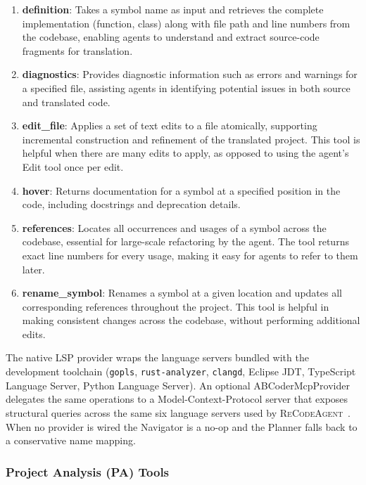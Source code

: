 \begin{enumerate}
    \item \textbf{definition}: Takes a symbol name as input and
    retrieves the complete implementation (function, class) along with
    file path and line numbers from the codebase, enabling agents to
    understand and extract source-code fragments for translation.
    \item \textbf{diagnostics}: Provides diagnostic information such as
    errors and warnings for a specified file, assisting agents in
    identifying potential issues in both source and translated code.
    \item \textbf{edit\_file}: Applies a set of text edits to a file
    atomically, supporting incremental construction and refinement of
    the translated project. This tool is helpful when there are many
    edits to apply, as opposed to using the agent's Edit tool once per
    edit.
    \item \textbf{hover}: Returns documentation for a symbol at a
    specified position in the code, including docstrings and
    deprecation details.
    \item \textbf{references}: Locates all occurrences and usages of a
    symbol across the codebase, essential for large-scale refactoring
    by the agent. The tool returns exact line numbers for every usage,
    making it easy for agents to refer to them later.
    \item \textbf{rename\_symbol}: Renames a symbol at a given location
    and updates all corresponding references throughout the project.
    This tool is helpful in making consistent changes across the
    codebase, without performing additional edits.
\end{enumerate}

The native LSP provider wraps the language servers bundled with the
development toolchain (\texttt{gopls}, \texttt{rust-analyzer},
\texttt{clangd}, Eclipse JDT, TypeScript Language Server, Python
Language Server). An optional ABCoderMcpProvider delegates the same
operations to a Model-Context-Protocol server that exposes structural
queries across the same six language servers used by
\textsc{ReCodeAgent}~\cite{ibrahimzada2026recodeagent}. When no
provider is wired the Navigator is a no-op and the Planner falls back
to a conservative name mapping.

\subsubsection{Project Analysis (PA) Tools}
\label{sec:method_tools_pa}

